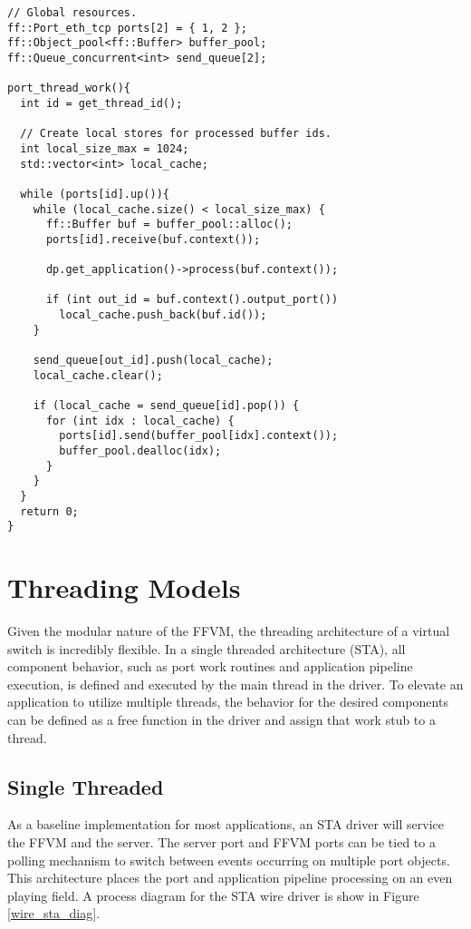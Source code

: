 \begin{lstlisting}
// Global resources.
ff::Port_eth_tcp ports[2] = { 1, 2 };
ff::Object_pool<ff::Buffer> buffer_pool;
ff::Queue_concurrent<int> send_queue[2];

port_thread_work(){
  int id = get_thread_id();

  // Create local stores for processed buffer ids.
  int local_size_max = 1024;
  std::vector<int> local_cache;

  while (ports[id].up()){
    while (local_cache.size() < local_size_max) {
      ff::Buffer buf = buffer_pool::alloc();
      ports[id].receive(buf.context());

      dp.get_application()->process(buf.context());

      if (int out_id = buf.context().output_port())
        local_cache.push_back(buf.id());
    }

    send_queue[out_id].push(local_cache);
    local_cache.clear();

    if (local_cache = send_queue[id].pop()) {
      for (int idx : local_cache) {
        ports[id].send(buffer_pool[idx].context());
        buffer_pool.dealloc(idx);
      }
    }
  }
  return 0;
}
\end{lstlisting}


\section{Threading Models}
\label{expr:models}
Given the modular nature of the FFVM, the threading architecture of a virtual
switch is incredibly flexible. In a single threaded architecture (STA), all
component behavior, such as port work routines and application pipeline
execution, is defined and executed by the main thread in the driver. To elevate
an application to utilize multiple threads, the behavior for the desired
components can be defined as a free function in the driver and assign that
work stub to a thread.

\subsection{Single Threaded}
\label{expr:models-single}
As a baseline implementation for most applications, an STA driver will service
the FFVM and the server. The server port and FFVM ports can be tied to a polling
mechanism to switch between events occurring on multiple port objects. This
architecture places the port and application pipeline processing on an even
playing field. A process diagram for the STA wire driver is show in Figure
\ref{wire_sta_diag}.

